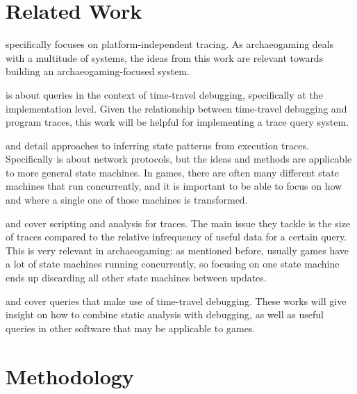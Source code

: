 \documentclass[manuscript,anonymous,review,authorversion=true,nonacm=true,screen]{acmart}
\newcommand{\outline}[1]{\iftoggle{showoutline}{#1}{}}
\begin{document}
\section{Related Work}

\cite{bao2008hmtt} specifically focuses on platform-independent tracing.
As archaeogaming deals with a multitude of systems, the ideas from this work are relevant towards building an archaeogaming-focused system.

\cite{barr2014tardis} is about queries in the context of time-travel debugging, specifically at the implementation level.
Given the relationship between time-travel debugging and program traces, this work will be helpful for implementing a trace query system.

\cite{wang2011inferring} and \cite{walkinshaw2013inferring} detail approaches to inferring state patterns from execution traces.
Specifically \cite{wang2011inferring} is about network protocols, but the ideas and methods are applicable to more general state machines.
In games, there are often many different state machines that run concurrently, and it is important to be able to focus on how and where a single one of those machines is transformed.

\cite{kouame2015flexible} and \cite{wininger2017declarative} cover scripting and analysis for traces.
The main issue they tackle is the size of traces compared to the relative infrequency of useful data for a certain query.
This is very relevant in archaeogaming: as mentioned before, usually games have a lot of state machines running concurrently, so focusing on one state machine ends up discarding all other state machines between updates.

\cite{phang2013expositor} and \cite{willembrinck2021time} cover queries that make use of time-travel debugging.
These works will give insight on how to combine static analysis with debugging, as well as useful queries in other software that may be applicable to games.

\section{Methodology}\label{sec:methodology}

\outline{
\begin{itemize}
    \item start with a ``stupid'' analyzer in Python
    \item move to a ``less stupid'' SQL interface that uses a forward and backward copy of deltas
    \item move to a ``smart'' interface based on the ideas from PANDA
\end{itemize}
}
\end{document}
